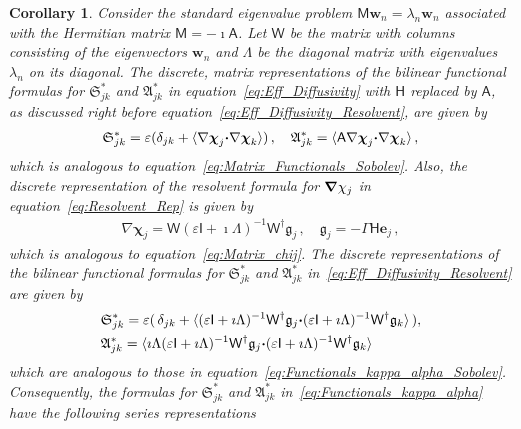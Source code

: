 \documentclass[english,12pt,jmp,graphicx]{revtex4-1}
\newcommand{\vecw}{\boldsymbol{w}}
\newcommand{\vecg}{\mathfrak{g}}
\newcommand{\vece}{\boldsymbol{e}}
\newcommand{\bnabla}{\mbox{\boldmath${\nabla}$}}
\newcommand{\bcdot}{\mbox{\boldmath${\cdot}$}}
\newcommand{\Sg}{\mathfrak{S}}
\newcommand{\Ag}{\mathfrak{A}}
\newtheorem{corollary}[theorem]{Corollary}
\newcommand{\vecchi}{\boldsymbol{\chi}}
\newcommand{\Hm}{\mathsf{H}}
\newcommand{\Mm}{\mathsf{M}}
\newcommand{\Am}{\mathsf{A}}
\newcommand{\Wm}{\mathsf{W}}
\newcommand{\Ib}{\mathsf{I}}
\begin{document}
%
\begin{corollary}\label{cor:Int_Rep_Matrix}
%
Consider the standard eigenvalue problem
$\Mm\vecw_n=\lambda_n\vecw_n$ associated with the Hermitian matrix
$\Mm=-\imath\Am$. Let $\Wm$ be the matrix with 
columns consisting of the eigenvectors $\vecw_n$ and $\Lambda$ be the
diagonal matrix with eigenvalues $\lambda_n$ on its diagonal. 
The discrete, matrix representations of the bilinear functional
formulas for $\Sg^*_{jk}$ and $\Ag^*_{jk}$ in
equation~\eqref{eq:Eff_Diffusivity} with $\Hm$ replaced by $\Am$, as 
discussed right before equation~\eqref{eq:Eff_Diffusivity_Resolvent},
are given by   
%
\begin{align}\label{eq:Matrix_Functionals}
  \Sg^*_{jk}
  =\varepsilon(\delta_{jk}
  +\langle\nabla\vecchi_j\bcdot\nabla\vecchi_k\rangle)\,,
  \quad
  \Ag^*_{jk}
  =\langle\Am\nabla\vecchi_j\bcdot\nabla\vecchi_k\rangle\,,   
\end{align}
%
which is analogous to equation~\eqref{eq:Matrix_Functionals_Sobolev}.
Also, the discrete representation of the resolvent formula for 
$\bnabla\chi_j$ in equation~\eqref{eq:Resolvent_Rep} 
is given by
%
\begin{align}\label{eq:Disc_Reslovent_CurL}
  \nabla\vecchi_j=\Wm(\varepsilon\Ib+\imath\Lambda)^{-1}\Wm^\dagger\vecg_j\,,
  \quad
  \vecg_j=-\Gamma\Hm\vece_j\,,
\end{align}
%
which is analogous to equation~\eqref{eq:Matrix_chij}.
The discrete representations of the bilinear functional
formulas for $\Sg^*_{jk}$ and $\Ag^*_{jk}$
in~\eqref{eq:Eff_Diffusivity_Resolvent} are given by 
% 
\begin{align}\label{eq:Functionals_kappa_alpha}
  &\Sg^*_{jk}
  =\varepsilon(\,\delta_{jk}+\langle(\varepsilon\Ib+\imath\Lambda)^{-1}\Wm^\dagger\vecg_j\bcdot(\varepsilon\Ib+\imath\Lambda)^{-1}\Wm^\dagger\vecg_k\rangle\,) ,
\\
&\Ag^*_{jk}
  =\langle\imath\Lambda(\varepsilon\Ib+\imath\Lambda)^{-1}\Wm^\dagger\vecg_j\bcdot(\varepsilon\Ib+\imath\Lambda)^{-1}\Wm^\dagger\vecg_k\rangle
\notag
\end{align}
%
which are analogous to those in
equation~\eqref{eq:Functionals_kappa_alpha_Sobolev}. 
Consequently, the formulas for $\Sg^*_{jk}$ and $\Ag^*_{jk}$
in~\eqref{eq:Functionals_kappa_alpha} have the following series
representations   
%
\begin{align}\label{eq:Discrete_Integrals_full_rank}

\end{align}
\end{corollary}
\end{document}
